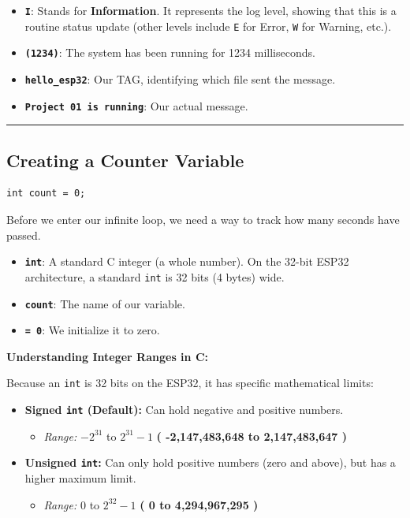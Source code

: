 \documentclass[11pt]{article}
\begin{document}
\begin{itemize}
    \item \textbf{\texttt{I}}: Stands for \textbf{Information}. It represents the log level, showing that this is a routine status update (other levels include \texttt{E} for Error, \texttt{W} for Warning, etc.).
    
    \item \textbf{\texttt{(1234)}}: The system has been running for 1234 milliseconds.
    
    \item \textbf{\texttt{hello\_esp32}}: Our TAG, identifying which file sent the message.
    
    \item \textbf{\texttt{Project 01 is running}}: Our actual message.
\end{itemize}

\bigskip
\noindent\rule{\textwidth}{0.4pt}
\bigskip

\subsection*{Creating a Counter Variable}

\begin{verbatim}
int count = 0;
\end{verbatim}

Before we enter our infinite loop, we need a way to track how many seconds have passed.

\begin{itemize}
    \item \textbf{\texttt{int}}: A standard C integer (a whole number). On the 32-bit ESP32 architecture, a standard \texttt{int} is 32 bits (4 bytes) wide.
    
    \item \textbf{\texttt{count}}: The name of our variable.
    
    \item \textbf{\texttt{= 0}}: We initialize it to zero.
\end{itemize}

\textbf{Understanding Integer Ranges in C:}

Because an \texttt{int} is 32 bits on the ESP32, it has specific mathematical limits:

\begin{itemize}
    \item \textbf{Signed \texttt{int} (Default):} Can hold negative and positive numbers.
    \begin{itemize}
        \item \emph{Range:} $-2^{31}$ to $2^{31} - 1$ \textbf{( -2,147,483,648 to 2,147,483,647 )}
    \end{itemize}

    \item \textbf{Unsigned \texttt{int}:} Can only hold positive numbers (zero and above), but has a higher maximum limit.
    \begin{itemize}
        \item \emph{Range:} $0$ to $2^{32} - 1$ \textbf{( 0 to 4,294,967,295 )}
    \end{itemize}
\end{itemize}
\end{document}
